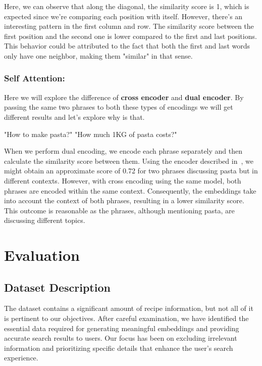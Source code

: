\documentclass[runningheads]{llncs}
\begin{document}
Here, we can observe that along the diagonal, the similarity score is 1, which is expected since we're comparing each position with itself. However, there's an interesting pattern in the first column and row. The similarity score between the first position and the second one is lower compared to the first and last positions. This behavior could be attributed to the fact that both the first and last words only have one neighbor, making them "similar" in that sense.
\subsubsection{Self Attention:} 
Here we will explore the difference of \textbf{cross encoder} and \textbf{dual encoder}. By passing the same two phrases to both these types of encodings we will get different results and let's explore why is that.\\[5pt]

\hspace{0.5cm} %
\begin{minipage}{1.2\textwidth} %
\begin{dialogue}
 "How to make pasta?"
 "How much 1KG of pasta costs?"\\[5pt]
\end{dialogue}
\end{minipage}
When we perform dual encoding, we encode each phrase separately and then calculate the similarity score between them. Using the encoder described in~\cite{reimers-2019-sentence-bert}, we might obtain an approximate score of 0.72 for two phrases discussing pasta but in different contexts. However, with cross encoding using the same model, both phrases are encoded within the same context. Consequently, the embeddings take into account the context of both phrases, resulting in a lower similarity score. This outcome is reasonable as the phrases, although mentioning pasta, are discussing different topics.
\section{Evaluation}
\subsection{Dataset Description}
The dataset contains a significant amount of recipe information, but not all of it is pertinent to our objectives. After careful examination, we have identified the essential data required for generating meaningful embeddings and providing accurate search results to users. Our focus has been on excluding irrelevant information and prioritizing specific details that enhance the user's search experience.
\end{document}
